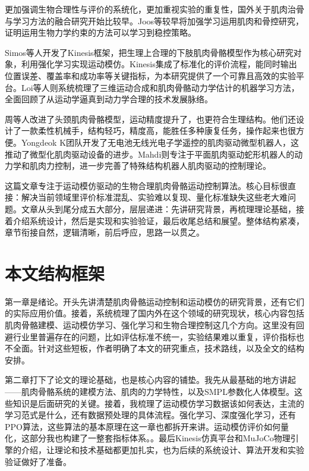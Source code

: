 更加强调生物合理性与评价的系统化，更加重视实验的重复性，国外关于肌肉治骨与学习方法的融合研究开始比较早。Joos等较早将加强学习运用肌肉和骨控研究，证明运用生物力学约束的方法可以学习到稳控策略\cite{ref18}。

Simos等人开发了Kinesis框架，把生理上合理的下肢肌肉骨骼模型作为核心研究对象，利用强化学习实现运动模仿。Kinesis集成了标准化的评价流程，能同时输出位置误差、覆盖率和成功率等关键指标，为本研究提供了一个可靠且高效的实验平台\cite{ref20}。Loi等人则系统梳理了三维运动合成和肌肉骨骼动力学估计的机器学习方法，全面回顾了从运动学逼真到动力学合理的技术发展脉络\cite{ref21}。

周等人改进了头颈肌肉骨骼模型，运动精度提升了，也更符合生理结构\cite{ref22}。他们还设计了一款柔性机械手，结构轻巧，精度高，能胜任多种康复任务，操作起来也很方便\cite{ref23}。Yongdeok
K团队开发了无电池无线光电子学遥控的肌肉驱动微型机器人，这推动了微型化肌肉驱动设备的进步\cite{ref24}。Mahdi则专注于平面肌肉驱动蛇形机器人的动力学和肌肉力控制，进一步完善了特殊结构机器人肌肉驱动的控制理论\cite{ref25}。

这篇文章专注于运动模仿驱动的生物合理肌肉骨骼运动控制算法。核心目标很直接：解决当前领域里评价标准混乱、实验难以复现、量化标准缺失这些老大难问题。文章从头到尾分成五大部分，层层递进：先讲研究背景，再梳理理论基础，接着介绍系统设计，然后是实现和实验验证，最后收尾总结和展望。整体结构紧凑，章节衔接自然，逻辑清晰，前后呼应，思路一以贯之。

\section{本文结构框架}\label{ux672cux6587ux7ed3ux6784ux6846ux67b6}

第一章是绪论。开头先讲清楚肌肉骨骼运动控制和运动模仿的研究背景，还有它们的实际应用价值。接着，系统梳理了国内外在这个领域的研究现状，核心内容包括肌肉骨骼建模、运动模仿学习、强化学习和生物合理控制这几个方向。这里没有回避行业里普遍存在的问题，比如评估标准不统一，实验结果难以重复，评价指标也不全面。针对这些短板，作者明确了本文的研究重点，技术路线，以及全文的结构安排。

第二章打下了论文的理论基础，也是核心内容的铺垫。我先从最基础的地方讲起——肌肉骨骼系统的建模方法、肌肉的力学特性，以及SMPL参数化人体模型。这些知识是后面研究的关键。接着，我梳理了运动模仿学习数据该如何表达，主流的学习范式是什么，还有数据预处理的具体流程。强化学习、深度强化学习，还有PPO算法，这些算法的基本原理在这一章也都拆开来讲。运动模仿评价如何量化，这部分我也构建了一整套指标体系。。最后Kinesis仿真平台和MuJoCo物理引擎的介绍，让理论和技术基础都更加扎实，也为后续的系统设计、算法开发和实验验证做好了准备。

